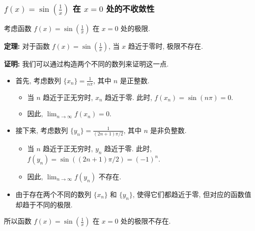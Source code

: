 \documentclass[
10pt, 
aspectratio=43, 
]{beamer}
\begin{document}
\begin{frame}
\frametitle{$f(x) = \sin\left(\frac{1}{x}\right)$ 在 $x=0$ 处的不收敛性}

考虑函数 $f(x) = \sin\left(\frac{1}{x}\right)$ 在 $x=0$ 处的极限. 

\pause

\textbf{定理: } 对于函数 $f(x) = \sin\left(\frac{1}{x}\right)$, 当 $x$ 趋近于零时, 极限不存在. 

\pause

\textbf{证明: } 
我们可以通过构造两个不同的数列来证明这一点. 

\pause

\begin{itemize}

\item 首先, 考虑数列 $\{x_n\} = \frac{1}{n\pi}$, 其中 $n$ 是正整数. 

\pause
\begin{itemize}
\item 当 $n$ 趋近于正无穷时, $x_n$ 趋近于零. 此时, $f(x_n) = \sin(n\pi) = 0$. 

\pause

\item 因此, $\lim_{n \to \infty} f(x_n) = 0$. 
\end{itemize}
\pause

\item 接下来, 考虑数列 $\{y_n\} = \frac{1}{(2n+1)\pi/2}$, 其中 $n$ 是非负整数. 

\pause
\begin{itemize}
\item 当 $n$ 趋近于正无穷时, $y_n$ 趋近于零. 此时, $f(y_n) = \sin((2n+1)\pi/2) = (-1)^n$. 

\pause

\item 因此, $\lim_{n \to \infty} f(y_n)$ 不存在. 


\end{itemize}

\pause

\item 由于存在两个不同的数列 $\{x_n\}$ 和 $\{y_n\}$, 使得它们都趋近于零, 但对应的函数值却趋于不同的极限.

\end{itemize}
\pause
所以函数 $f(x) = \sin\left(\frac{1}{x}\right)$ 在 $x=0$ 处的极限不存在. 
\end{frame}
\end{document}
